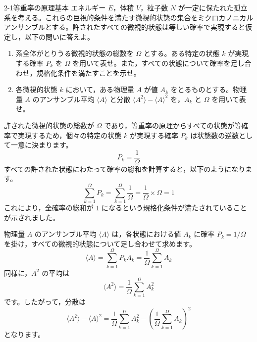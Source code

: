 
\begin{mondai}{2-1}{等重率の原理}{基本}
エネルギー $E$，体積 $V$，粒子数 $N$ が一定に保たれた孤立系を考える。これらの巨視的条件を満たす微視的状態の集合をミクロカノニカルアンサンブルとする。許されたすべての微視的状態は等しい確率で実現すると仮定し，以下の問いに答えよ。

\begin{enumerate}
  \item 系全体がとりうる微視的状態の総数を $\Omega$ とする。ある特定の状態 $k$ が実現する確率 $P_k$ を $\Omega$ を用いて表せ。また，すべての状態について確率を足し合わせ，規格化条件を満たすことを示せ。

  \item 各微視的状態 $k$ において，ある物理量 $A$ が値 $A_k$ をとるものとする。物理量 $A$ のアンサンブル平均 $\langle A \rangle$ と分散 $\langle A^2\rangle-\langle A\rangle^2$ を，$A_k$ と $\Omega$ を用いて表せ。
\end{enumerate}
\end{mondai}

\solutionheading
\begin{solutionparts}

許された微視的状態の総数が $\Omega$ であり，等重率の原理からすべての状態が等確率で実現するため，個々の特定の状態 $k$ が実現する確率 $P_k$ は状態数の逆数として一意に決まります。
\begin{equation*}
P_k = \frac{1}{\Omega}
\end{equation*}
すべての許された状態にわたって確率の総和を計算すると，以下のようになります。
\begin{equation*}
\sum_{k=1}^{\Omega} P_k = \sum_{k=1}^{\Omega} \frac{1}{\Omega} = \frac{1}{\Omega} \times \Omega = 1
\end{equation*}
これにより，全確率の総和が $1$ になるという規格化条件が満たされていることが示されました。

物理量 $A$ のアンサンブル平均 $\langle A \rangle$ は，各状態における値 $A_k$ に確率 $P_k = 1/\Omega$ を掛け，すべての微視的状態について足し合わせて求めます。
\begin{equation*}
\langle A \rangle = \sum_{k=1}^{\Omega} P_k A_k = \frac{1}{\Omega} \sum_{k=1}^{\Omega} A_k
\end{equation*}
同様に，$A^2$ の平均は
\begin{equation*}
\langle A^2\rangle=\frac{1}{\Omega}\sum_{k=1}^{\Omega}A_k^2
\end{equation*}
です。したがって，分散は
\begin{equation*}
\langle A^2\rangle-\langle A\rangle^2
=\frac{1}{\Omega}\sum_{k=1}^{\Omega}A_k^2
-\left(\frac{1}{\Omega}\sum_{k=1}^{\Omega}A_k\right)^2
\end{equation*}
となります。

\end{solutionparts}

